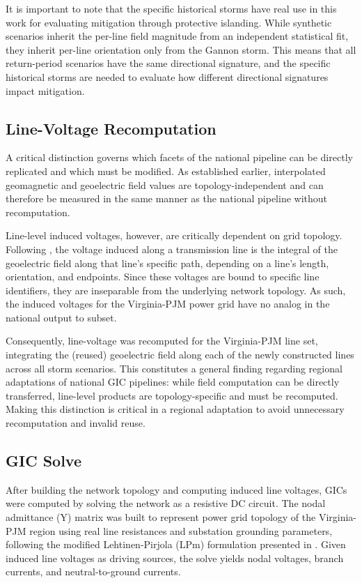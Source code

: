\documentclass[draft]{agujournal2019}
\begin{document}
It is important to note that the specific historical storms have real use in this work for evaluating mitigation through protective islanding. While synthetic scenarios inherit the per-line field magnitude from an independent statistical fit, they inherit per-line orientation only from the Gannon storm. This means that all return-period scenarios have the same directional signature, and the specific historical storms are needed to evaluate how different directional signatures impact mitigation. 

\subsection{Line-Voltage Recomputation}

A critical distinction governs which facets of the national pipeline can be directly replicated and which must be modified. As established earlier, interpolated geomagnetic and geoelectric field values are topology-independent and can therefore be measured in the same manner as the national pipeline without recomputation.

Line-level induced voltages, however, are critically dependent on grid topology. Following , the voltage induced along a transmission line is the integral of the geoelectric field along that line's specific path, depending on a line's length, orientation, and endpoints. Since these voltages are bound to specific line identifiers, they are inseparable from the underlying network topology. As such, the induced voltages for the Virginia-PJM power grid have no analog in the national output to subset.

Consequently, line-voltage was recomputed for the Virginia-PJM line set, integrating the (reused) geoelectric field along each of the newly constructed lines across all storm scenarios. This constitutes a general finding regarding regional adaptations of national GIC pipelines: while field computation can be directly transferred, line-level products are topology-specific and must be recomputed. Making this distinction is critical in a regional adaptation to avoid unnecessary recomputation and invalid reuse. 

\subsection{GIC Solve}

After building the network topology and computing induced line voltages, GICs were computed by solving the network as a resistive DC circuit. The nodal admittance (Y) matrix was built to represent power grid topology of the Virginia-PJM region using real line resistances and substation grounding parameters, following the modified Lehtinen-Pirjola (LPm) formulation presented in . Given induced line voltages as driving sources, the solve yields nodal voltages, branch currents, and neutral-to-ground currents.
\end{document}

